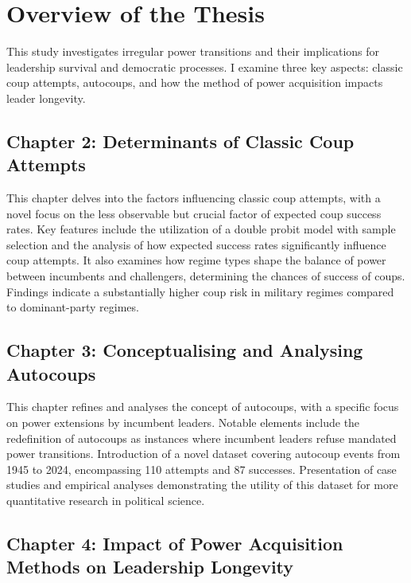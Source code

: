 \documentclass[
  12pt,
]{report}
\begin{document}
\section{Overview of the Thesis}\label{overview-of-the-thesis}

This study investigates irregular power transitions and their
implications for leadership survival and democratic processes. I examine
three key aspects: classic coup attempts, autocoups, and how the method
of power acquisition impacts leader longevity.

\subsection{Chapter 2: Determinants of Classic Coup
Attempts}\label{chapter-2-determinants-of-classic-coup-attempts}

This chapter delves into the factors influencing classic coup attempts,
with a novel focus on the less observable but crucial factor of expected
coup success rates. Key features include the utilization of a double
probit model with sample selection and the analysis of how expected
success rates significantly influence coup attempts. It also examines
how regime types shape the balance of power between incumbents and
challengers, determining the chances of success of coups. Findings
indicate a substantially higher coup risk in military regimes compared
to dominant-party regimes.

\subsection{Chapter 3: Conceptualising and Analysing
Autocoups}\label{chapter-3-conceptualising-and-analysing-autocoups}

This chapter refines and analyses the concept of autocoups, with a
specific focus on power extensions by incumbent leaders. Notable
elements include the redefinition of autocoups as instances where
incumbent leaders refuse mandated power transitions. Introduction of a
novel dataset covering autocoup events from 1945 to 2024, encompassing
110 attempts and 87 successes. Presentation of case studies and
empirical analyses demonstrating the utility of this dataset for more
quantitative research in political science.

\subsection{Chapter 4: Impact of Power Acquisition Methods on Leadership
Longevity}\label{chapter-4-impact-of-power-acquisition-methods-on-leadership-longevity}
\end{document}
